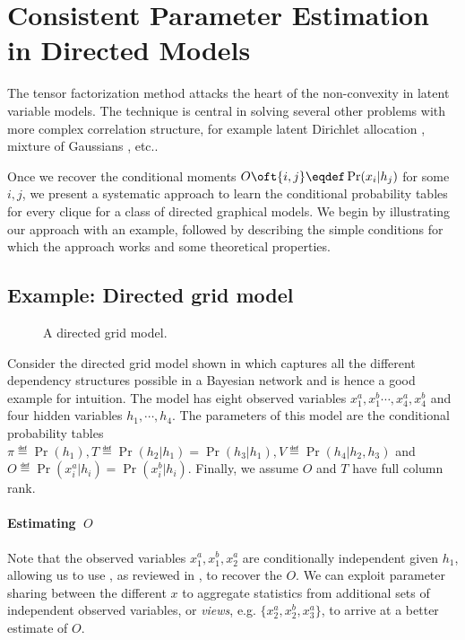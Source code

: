 \section{Consistent Parameter Estimation in Directed Models}
\label{sec:directed}

The tensor factorization method attacks the heart of the non-convexity
  in latent variable models.
The technique is central in solving several other problems with more
  complex correlation structure, for example latent Dirichlet allocation
  \citep{anandkumar12lda}, mixture of Gaussians \citep{hsu13spherical},
  etc..

Once we recover the conditional moments $O\oft{i,j} \eqdef \Pr(x_i
  | h_j)$ for some $i,j$, we present a systematic approach to learn the
  conditional probability tables for every clique for a class of directed
  graphical models.
We begin by illustrating our approach with an example, followed by
  describing the simple conditions for which the approach works and some
  theoretical properties.

\subsection{Example: Directed grid model}

\begin{figure}
  \centering
  
  \caption{A directed grid model.}
  \label{fig:grid}
\end{figure}

Consider the directed grid model shown in  which
  captures all the different dependency structures possible in
  a Bayesian network and is hence a good example for intuition\reword.
The model has eight observed variables $x^a_1, x^b_1 \cdots, x^a_4, x^b_4$ and four
  hidden variables $h_1, \cdots, h_4$.
The parameters of this model are the conditional probability tables
  $\pi \eqdef \Pr(h_1), T \eqdef \Pr(h_2 | h_1) = \Pr(h_3 | h_1),
  V \eqdef \Pr(h_4 | h_2, h_3)$ and $O \eqdef \Pr(x^a_i | h_i)
  =  \Pr(x^b_i | h_i)$. 
Finally, we assume $O$ and $T$ have full column rank.

\paragraph{Estimating $~O$}

Note that the observed variables $x^a_1, x^b_1, x^a_2$ are
  conditionally independent given $h_1$, allowing us to use
  \TensorFactorize, as reviewed in , to recover
  the $O$.
We can exploit parameter sharing between the different $x$ to aggregate
  statistics from additional sets of independent
  observed variables, or {\em views}, e.g. $\{x^a_2, x^b_2, x^a_3\}$, to
  arrive at a better estimate of $O$.

